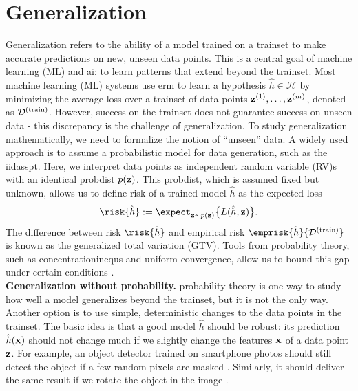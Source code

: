 \documentclass{article}
\begin{document}
\section*{Generalization}


 Generalization refers to the ability of a model trained on a trainset to make accurate
 predictions on new, unseen data points. This is a central goal of machine learning (ML) and ai:
 to learn patterns that extend beyond the trainset. Most machine learning (ML) systems
 use erm to learn a hypothesis $\hat{h} \in \mathcal{H}$ by minimizing
 the average loss over a trainset of data points ${\bf z}^{(1)}, \ldots, {\bf z}^{(m)}$,
 denoted as $\mathcal{D}^{(\rm train)}$. However, success on the trainset does not guarantee success on
 unseen data - this discrepancy is the challenge of generalization. To study generalization
 mathematically, we need to formalize the notion of ``unseen'' data. A widely used
 approach is to assume a probabilistic model for data generation, such as the iidasspt.
 Here, we interpret data points as independent random variable (RV)s with an identical
 probdist $p({\bf z})$. This probdist, which is assumed fixed but unknown,
 allows us to define risk of a trained model $\hat{h}$ as the expected loss
 \[
 \risk{\hat{h}} := \expect_{{\bf z} \sim p({\bf z})} \big\{ L(\hat{h}, {\bf z}) \big\}.
 \]
 The difference between risk $\risk{\hat{h}}$ and empirical risk $\emprisk{\hat{h}}{\mathcal{D}^{(\rm train)}}$
 is known as the generalized total variation (GTV). Tools from probability theory, such as concentrationinequs
 and uniform convergence, allow us to bound this gap under certain conditions \cite{ShalevMLBook}.\\
 {\bf Generalization without probability.} \Gls{probability} theory is one way to study how well a
 model generalizes beyond the trainset, but it is not the only way. Another option is to use
 simple, deterministic changes to the data points in the trainset. The basic idea is that a
 good model $\hat{h}$ should be robust: its prediction $\hat{h}({\bf x})$
 should not change much if we slightly change the features ${\bf x}$ of a data point ${\bf z}$.
 For example, an object detector trained on smartphone photos should still detect the object if a few
 random pixels are masked \cite{OnePixelAttack}. Similarly, it should deliver the same result if we rotate
 the object in the image \cite{MallatUnderstandingDeepLearning}.
\end{document}
